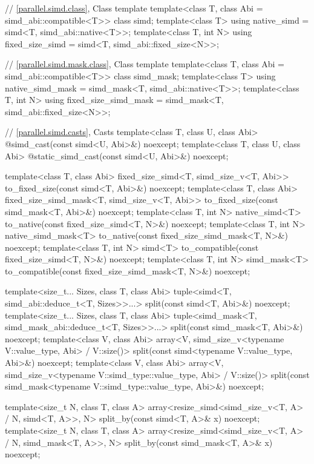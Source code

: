 \begin{codeblock}
{{  // \ref{parallel.simd.class}, Class template 
  template<class T, class Abi = simd_abi::compatible<T>> class simd;
  template<class T> using native_simd = simd<T, simd_abi::native<T>>;
  template<class T, int N> using fixed_size_simd = simd<T, simd_abi::fixed_size<N>>;

  // \ref{parallel.simd.mask.class}, Class template 
  template<class T, class Abi = simd_abi::compatible<T>> class simd_mask;
  template<class T> using native_simd_mask = simd_mask<T, simd_abi::native<T>>;
  template<class T, int N> using fixed_size_simd_mask =
    simd_mask<T, simd_abi::fixed_size<N>>;

  // \ref{parallel.simd.casts}, Casts
  template<class T, class U, class Abi> @\seebelow@ simd_cast(const simd<U, Abi>&) noexcept;
  template<class T, class U, class Abi> @\seebelow@ static_simd_cast(const simd<U, Abi>&) noexcept;

  template<class T, class Abi>
    fixed_size_simd<T, simd_size_v<T, Abi>>
      to_fixed_size(const simd<T, Abi>&) noexcept;
  template<class T, class Abi>
    fixed_size_simd_mask<T, simd_size_v<T, Abi>>
      to_fixed_size(const simd_mask<T, Abi>&) noexcept;
  template<class T, int N>
    native_simd<T> to_native(const fixed_size_simd<T, N>&) noexcept;
  template<class T, int N>
    native_simd_mask<T> to_native(const fixed_size_simd_mask<T, N>&) noexcept;
  template<class T, int N>
    simd<T> to_compatible(const fixed_size_simd<T, N>&) noexcept;
  template<class T, int N>
    simd_mask<T> to_compatible(const fixed_size_simd_mask<T, N>&) noexcept;

  template<size_t... Sizes, class T, class Abi>
    tuple<simd<T, simd_abi::deduce_t<T, Sizes>>...>
      split(const simd<T, Abi>&) noexcept;
  template<size_t... Sizes, class T, class Abi>
    tuple<simd_mask<T, simd_mask_abi::deduce_t<T, Sizes>>...>
      split(const simd_mask<T, Abi>&) noexcept;
  template<class V, class Abi>
    array<V, simd_size_v<typename V::value_type, Abi> / V::size()>
      split(const simd<typename V::value_type, Abi>&) noexcept;
  template<class V, class Abi>
    array<V, simd_size_v<typename V::simd_type::value_type, Abi> / V::size()>
      split(const simd_mask<typename V::simd_type::value_type, Abi>&) noexcept;

  template<size_t N, class T, class A>
    array<resize_simd<simd_size_v<T, A> / N, simd<T, A>>, N>
      split_by(const simd<T, A>& x) noexcept;
  template<size_t N, class T, class A>
    array<resize_simd<simd_size_v<T, A> / N, simd_mask<T, A>>, N>
      split_by(const simd_mask<T, A>& x) noexcept;

}}
\end{codeblock}
